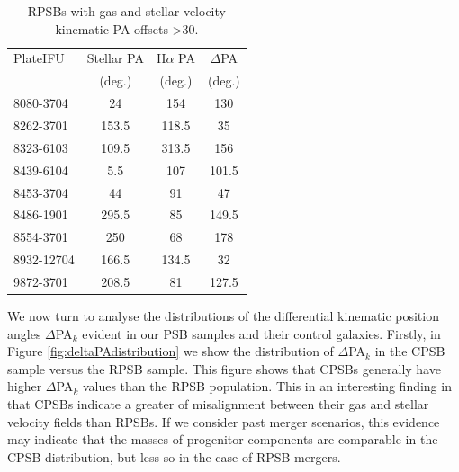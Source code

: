 \begin{table}
\centering
\caption[RPSBs with kinematic velocity PA offsets \textgreater 30\textdegree.]{RPSBs with gas and stellar velocity kinematic PA offsets \textgreater 30\textdegree.}
\label{tab:offsetRPSBs}
\begin{tabular}{lccc}
\hline
PlateIFU   & Stellar PA & H$\alpha$ PA & $\Delta$PA \\
  & (deg.) & (deg.) & (deg.) \\
\hline
8080-3704 & 24 & 154 & 130 \\
8262-3701 & 153.5 & 118.5 & 35 \\
8323-6103 & 109.5 & 313.5 & 156 \\
8439-6104 & 5.5 & 107 & 101.5 \\
8453-3704 & 44 & 91 & 47 \\
8486-1901 & 295.5 & 85 & 149.5 \\
8554-3701 & 250 & 68 & 178 \\
8932-12704 & 166.5 & 134.5 & 32 \\
9872-3701 & 208.5 & 81 & 127.5 \\
\hline
\end{tabular}
\end{table}

We now turn to analyse the distributions of the differential kinematic position angles $\Delta$PA$_{k}$ evident in our PSB samples and their control galaxies. Firstly, in Figure \ref{fig:deltaPAdistribution} we show the distribution of $\Delta$PA$_{k}$ in the CPSB sample versus the RPSB sample. This figure shows that CPSBs generally have higher $\Delta$PA$_{k}$ values than the RPSB population. This in an interesting finding in that CPSBs indicate a greater of misalignment between their gas and stellar velocity fields than RPSBs. If we consider past merger scenarios, this evidence may indicate that the masses of progenitor components are comparable in the CPSB distribution, but less so in the case of RPSB mergers.

